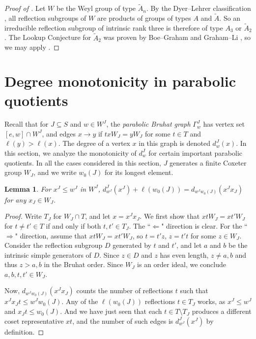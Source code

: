 \documentclass[11pt]{amsart}
\newtheorem{lemma}[lemma]{Lemma}
\theoremstyle{definition}
\theoremstyle{remark}
\numberwithin{equation}{section}
\begin{document}
\begin{proof}[Proof of ]
Let $W$ be the Weyl group of type $\widetilde{A}_n$. By the Dyer--Lehrer classification
\cite[Thm.~3]{DL}, all reflection subgroups of $W$ are products of groups of types $A$ and $\widetilde{A}$. So an irreducible reflection subgroup of intrinsic rank three is therefore of type $A_3$ or $\widetilde A_2$. The Lookup Conjecture for $\widetilde A_2$ was proven by Boe--Graham \cite{BGAffine} and Graham--Li \cite{GL}, so we may apply .
\end{proof}

\section{Degree monotonicity in parabolic quotients}
\label{sec:grassmannian}
Recall that for $J\subseteq S$ and $w\in W^J$, the \emph{parabolic Bruhat graph} $\Gamma_w^J$ has vertex set $[e,w]\cap W^J$, and edges $x \to y$ if $tx W_J=yW_J$ for some $t\in T$ and $\ell(y)>\ell(x)$. The degree of a vertex $x$ in this graph is denoted $d_w^J(x)$. In this section, we analyze the monotonicity of $d_w^J$ for certain important parabolic quotients. In all the cases considered in this section, $J$ generates a finite Coxeter group $W_J$, and we write $w_0(J)$ for its longest element.
\begin{lemma}\label{lem:degree-quotient-to-full}
For $x^J\leq w^J$ in $W^J$, $d_{w^J}^J(x^J)+\ell(w_0(J))=d_{w^Jw_0(J)}(x^Jx_J)$ for any $x_J\in W_J$.
\end{lemma}
\begin{proof}
Write $T_J$ for $W_J \cap T$, and let $x=x^Jx_J$. We first show that $xtW_J=xt'W_J$ for $t\neq t'\in T$ if and only if both $t,t'\in T_J$. The ``$\Leftarrow$" direction is clear. For the ``$\Rightarrow$" direction, assume that $xtW_J=xt'W_J$, so $t=t'z$, $z=t't$ for some $z\in W_J$. Consider the reflection subgroup $D$ generated by $t$ and $t'$, and let $a$ and $b$ be the intrinsic simple generators of $D$. Since $z\in D$ and $z$ has even length, $z\neq a,b$ and thus $z>a,b$ in the Bruhat order. Since $W_J$ is an order ideal, we conclude $a,b,t,t' \in W_J$. 

Now, $d_{w^Jw_0(J)}(x^Jx_J)$ counts the number of reflections $t$ such that $x^Jx_J t\leq w^Jw_0(J)$. Any of the $\ell(w_0(J))$ reflections $t\in T_J$ works, as $x^J\leq w^J$ and $x_Jt\leq w_0(J)$. And we have just seen that each $t\in T\setminus T_J$ produces a different coset representative $xt$, and the number of such edges is $d_{w^J}^J(x^J)$ by definition.
\end{proof}
\end{document}
